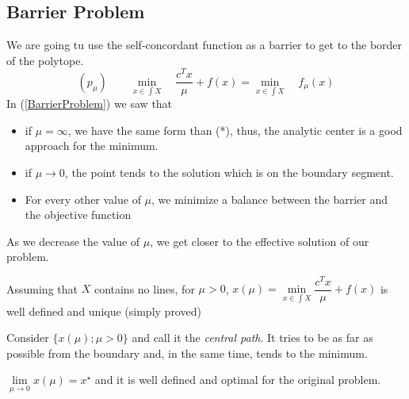 \subsection{Barrier Problem} 
We are going tu use the self-concordant function as a barrier to get to the border of the polytope.
\begin{equation}
\label{BarrierProblem}
(p_{\mu}) \qquad \underset{x \in \int X}{\min} \quad \dfrac{c^T x}{\mu} + f(x) = \underset{x \in \int X}{\min} \quad f_{\mu}(x)
\end{equation}
In (\ref{BarrierProblem}) we saw that
\begin{itemize}
\item if $\mu = \infty$, we have the same form than (*), thus, the analytic center is a good approach for the minimum.
\item if $\mu \rightarrow 0$, the point tends to the solution which is on the boundary segment.
\item For every other value of $\mu$, we minimize a balance between the barrier and the objective function
\end{itemize}
As we decrease the value of $\mu$, we get closer to the effective solution of our problem.
\newline
\begin{theorem}
Assuming that $X$ contains no lines, for $\mu > 0$, $x(\mu) = \underset{x \in \int X}{\min} \dfrac{c^T x}{\mu} + f(x)$ is well defined and unique (simply proved)
\end{theorem}
Consider $\lbrace x(\mu) ; \mu > 0 \rbrace$ and call it the \textit{central path}. It tries to be as far as possible from the boundary  and, in the same time, tends to the minimum.\\

\begin{property}
$\underset{\mu \rightarrow 0}{\lim} x(\mu) = x^{\star}$ and it is well defined and optimal for the original problem.
\end{property} 

